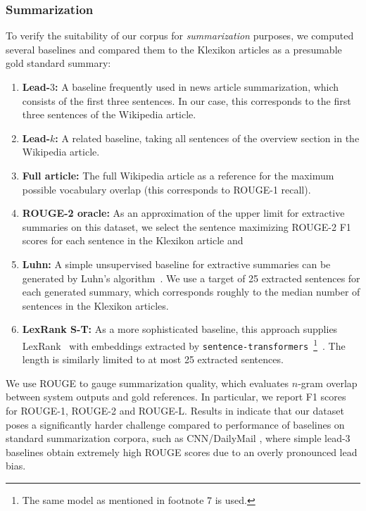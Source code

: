 \documentclass[10pt, a4paper]{article}
\begin{document}
\subsubsection{Summarization}
To verify the suitability of our corpus for \emph{summarization} purposes, we computed several  baselines and compared them to the Klexikon articles as a presumable gold standard summary:
\begin{enumerate}
	\item \textbf{Lead-$3$:} A baseline frequently used in news article summarization, which consists of the first three sentences. In our case, this corresponds to the first three sentences of the Wikipedia article.
	\item \textbf{Lead-$k$:} A related baseline, taking all sentences of the overview section in the Wikipedia article.
	\item \textbf{Full article:} The full Wikipedia article as a reference for the maximum possible vocabulary overlap (this corresponds to ROUGE-1 recall).
	\item \textbf{ROUGE-2 oracle:} As an approximation of the upper limit for extractive summaries on this dataset, we select the sentence maximizing ROUGE-2 F1 scores for each sentence in the Klexikon article and 
	\item \textbf{Luhn:} A simple unsupervised baseline for extractive summaries can be generated by Luhn's algorithm~\cite{luhn-1958-automatic}. We use a target of 25 extracted sentences for each generated summary, which corresponds roughly to the median number of sentences in the Klexikon articles.
	\item \textbf{LexRank S-T:} As a more sophisticated baseline, this approach supplies LexRank~\cite{erkan-radev-2004-lexrank} with embeddings extracted by \texttt{sentence-transformers}~\cite{reimers-gurevych-2019-sentence}\footnote{The same model as mentioned in footnote 7 is used.}~. The length is similarly limited to at most 25 extracted sentences.
	
\end{enumerate}

We use ROUGE \cite{lin-2004-rouge} to gauge summarization quality, which evaluates $n$-gram overlap between system outputs and gold references. In particular, we report F1 scores for ROUGE-1, ROUGE-2 and ROUGE-L.
Results in  indicate that our dataset poses a significantly harder challenge compared to performance of baselines on standard summarization corpora, such as CNN/DailyMail \cite{nallapati2017summarunner}, where simple lead-3 baselines obtain extremely high ROUGE scores due to an overly pronounced lead bias.
\end{document}
